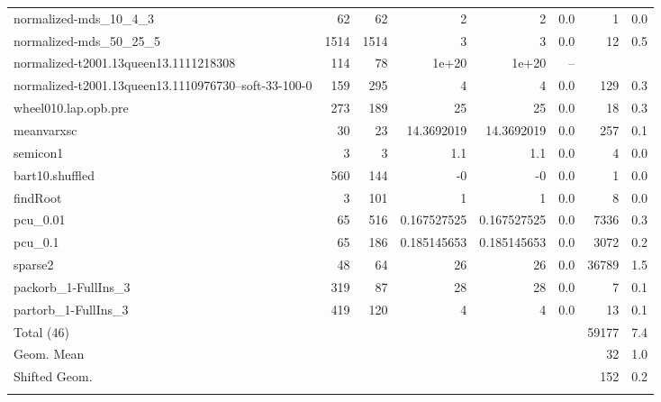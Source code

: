 \documentclass[leqno]{article}
\begin{document}
\begin{center}
\begin{supertabular*}{\textwidth}{@{\extracolsep{\fill}}lrrrrrrr@{}}
normalized-mds\_10\_4\_3 &     62 &     62 &                2 &                2 &    0.0 &         1 &      0.0\\
normalized-mds\_50\_25\_5 &   1514 &   1514 &                3 &                3 &    0.0 &        12 &      0.5\\
normalized-t2001.13queen13.1111218308 &    114 &     78 &            1e+20 &            1e+20 &   --   & &\\
normalized-t2001.13queen13.1110976730--soft-33-100-0 &    159 &    295 &                4 &                4 &    0.0 &       129 &      0.3\\
wheel010.lap.opb.pre &    273 &    189 &               25 &               25 &    0.0 &        18 &      0.3\\
meanvarxsc         &     30 &     23 &       14.3692019 &       14.3692019 &    0.0 &       257 &      0.1\\
semicon1           &      3 &      3 &              1.1 &              1.1 &    0.0 &         4 &      0.0\\
bart10.shuffled    &    560 &    144 &               -0 &               -0 &    0.0 &         1 &      0.0\\
findRoot           &      3 &    101 &                1 &                1 &    0.0 &         8 &      0.0\\
pcu\_0.01          &     65 &    516 &      0.167527525 &      0.167527525 &    0.0 &      7336 &      0.3\\
pcu\_0.1           &     65 &    186 &      0.185145653 &      0.185145653 &    0.0 &      3072 &      0.2\\
sparse2            &     48 &     64 &               26 &               26 &    0.0 &     36789 &      1.5\\
packorb\_1-FullIns\_3 &    319 &     87 &               28 &               28 &    0.0 &         7 &      0.1\\
partorb\_1-FullIns\_3 &    419 &    120 &                4 &                4 &    0.0 &        13 &      0.1\\
\midrule
Total          (46) &        &        &                &                &        &     59177 &      7.4\\
Geom. Mean          &        &        &                &                &        &        32 &      1.0\\
Shifted Geom.       &        &        &                &                &        &       152 &      0.2 \\
\noalign{\vspace{6pt}}
\end{supertabular*}
\end{center}
\end{document}

